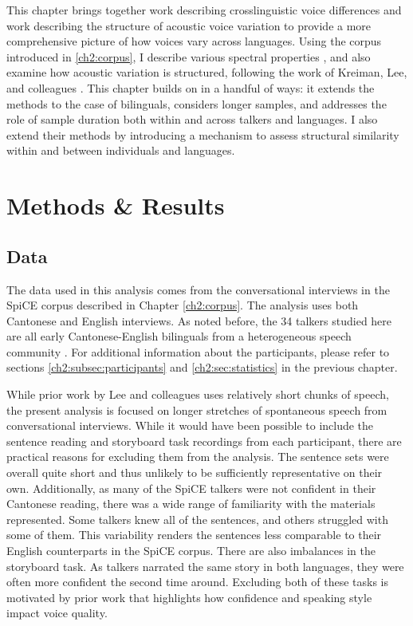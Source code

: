 This chapter brings together work describing crosslinguistic voice differences and work describing the structure of acoustic voice variation to provide a more comprehensive picture of how voices vary across languages. Using the corpus introduced in \ref{ch2:corpus}, I describe various spectral properties \citep[e.g.][]{ng_2012_ltas}, and also examine how acoustic variation is structured, following the work of Kreiman, Lee, and colleagues \citep{kreiman_2014_theory,lee_2019_acoustic}. This chapter builds on \citet{lee_2019_acoustic} in a handful of ways: it extends the methods to the case of bilinguals, considers longer samples, and addresses the role of sample duration both within and across talkers and languages. I also extend their methods by introducing a mechanism to assess structural similarity within and between individuals and languages. 

\section{Methods \& Results}\label{ch3:sec:methods_results}

\subsection{Data}\label{ch3:sec:data}

The data used in this analysis comes from the conversational interviews in the SpiCE corpus described in Chapter \ref{ch2:corpus}. The analysis uses both Cantonese and English interviews. As noted before, the 34 talkers studied here are all early Cantonese-English bilinguals from a heterogeneous speech community \citep{liang_2015_china}. For additional information about the participants, please refer to sections \ref{ch2:subsec:participants} and \ref{ch2:sec:statistics} in the previous chapter. 

While prior work by Lee and colleagues \citep[e.g.,][]{lee_2019_acoustic} uses relatively short chunks of speech, the present analysis is focused on longer stretches of spontaneous speech from conversational interviews. While it would have been possible to include the sentence reading and storyboard task recordings from each participant, there are practical reasons for excluding them from the analysis. The sentence sets were overall quite short and thus unlikely to be sufficiently representative on their own. Additionally, as many of the SpiCE talkers were not confident in their Cantonese reading, there was a wide range of familiarity with the materials represented. Some talkers knew all of the sentences, and others struggled with some of them. This variability renders the sentences less comparable to their English counterparts in the SpiCE corpus. There are also imbalances in the storyboard task. As talkers narrated the same story in both languages, they were often more confident the second time around. Excluding both of these tasks is motivated by prior work that highlights how confidence \citep{jarvinen_2013_speaking} and speaking style \citep{lee_2017_bilingual} impact voice quality. 

